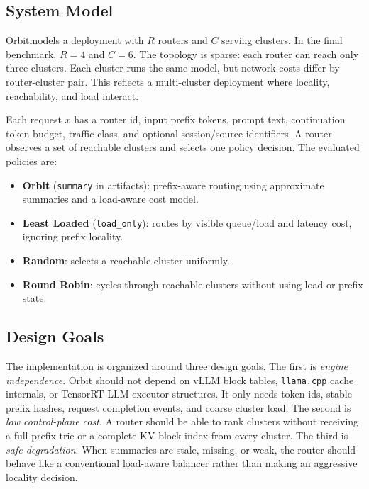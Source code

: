 \documentclass[10pt,twocolumn]{article}
\newcommand{\sys}{Orbit}
\begin{document}
\subsection{System Model}

\sys models a deployment with $R$ routers and $C$ serving clusters. In the final benchmark, $R=4$ and $C=6$. The topology is sparse: each router can reach only three clusters. Each cluster runs the same model, but network costs differ by router-cluster pair. This reflects a multi-cluster deployment where locality, reachability, and load interact.

Each request $x$ has a router id, input prefix tokens, prompt text, continuation token budget, traffic class, and optional session/source identifiers. A router observes a set of reachable clusters and selects one policy decision. The evaluated policies are:

\begin{itemize}[leftmargin=*]
\item \textbf{Orbit} (\texttt{summary} in artifacts): prefix-aware routing using approximate summaries and a load-aware cost model.
\item \textbf{Least Loaded} (\texttt{load\_only}): routes by visible queue/load and latency cost, ignoring prefix locality.
\item \textbf{Random}: selects a reachable cluster uniformly.
\item \textbf{Round Robin}: cycles through reachable clusters without using load or prefix state.
\end{itemize}

\subsection{Design Goals}

The implementation is organized around three design goals. The first is \emph{engine independence}. Orbit should not depend on vLLM block tables, \texttt{llama.cpp} cache internals, or TensorRT-LLM executor structures. It only needs token ids, stable prefix hashes, request completion events, and coarse cluster load. The second is \emph{low control-plane cost}. A router should be able to rank clusters without receiving a full prefix trie or a complete KV-block index from every cluster. The third is \emph{safe degradation}. When summaries are stale, missing, or weak, the router should behave like a conventional load-aware balancer rather than making an aggressive locality decision.
\end{document}
